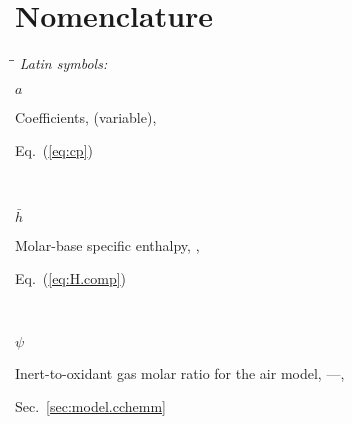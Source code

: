 \section*{Nomenclature}

\newlength{\lencsep}\setlength{\lencsep}{0.5em} %
\newlength{\lensymb}\setlength{\lensymb}{3.5em} %
\newlength{\lendefn}\setlength{\lendefn}{4.5em} %
\newlength{\lensybb}\setlength{\lensybb}{\lensymb}
\addtolength{\lensybb}{-\lencsep}
\newlength{\lenwhat}\setlength{\lenwhat}{\linewidth}
\addtolength{\lenwhat}{-\lensymb}
\addtolength{\lenwhat}{-\lendefn}
\newlength{\lenwhab}\setlength{\lenwhab}{\lenwhat}
\addtolength{\lenwhab}{-\lencsep}
\newlength{\lenWHAT}\setlength{\lenWHAT}{\linewidth}
\addtolength{\lenWHAT}{-\lensymb}
\newcommand{\tcs}[1]{\parbox[t]{\lensybb}{\ensuremath {#1}}}    %
\newcommand{\tcw}[1]{\parbox[t]{\lenwhab}{{#1}}}                %
\newcommand{\tcd}[1]{\parbox[t]{\lendefn}{\raggedright {#1}}}   %

\begin{tabbing}\hspace*{\lensymb}\=\hspace*{\lenwhat}\=\hspace*{\lendefn}\kill
{\em Latin symbols:} \\
    \tcs{a}         \> \tcw{Coefficients, (variable),}                                  \> \tcd{Eq.~(\ref{eq:cp})}          \\
    \tcs{\bar{h}}   \> \tcw{Molar-base specific enthalpy, \kilo\joule\per\kilo\mole,}   \> \tcd{Eq.~(\ref{eq:H.comp})}      \\
    \tcs{\psi}      \> \tcw{Inert-to-oxidant gas molar ratio for the air model, ---,}   \> \tcd{Sec.~\ref{sec:model.cchemm}}\\
\end{tabbing}

